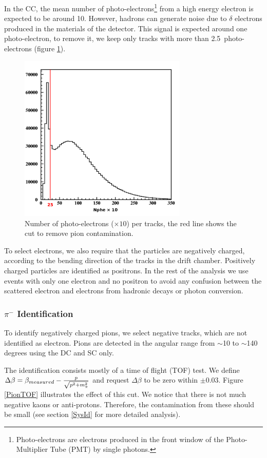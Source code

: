 In the CC, the mean number of photo-electrons\footnote{Photo-electrons are 
electrons produced in the front window of the Photo-Multiplier Tube (PMT) by 
single photons.} from a high energy electron is expected to be around 10.
However, hadrons can generate noise due to $\delta$ electrons produced in 
the materials of the detector. This signal is expected around 
one photo-electron, to remove it, we keep only tracks with more than 
2.5~photo-electrons (figure \ref{delta}). 

\begin{figure}[tbp]
\centering
\includegraphics[width=8cm] {chap5-fig/fig04.png} 
\caption {Number of photo-electrons ($\times 10$) per tracks, the red line 
shows the cut to remove pion contamination.}
\label{delta}
\end{figure}

To select electrons, we also require that the particles are negatively charged, 
according to the bending direction of the tracks in the drift chamber.
Positively charged particles are identified as positrons. In the rest of the 
analysis we use events with only one electron and no positron to avoid any 
confusion between the scattered electron and electrons from hadronic decays or 
photon conversion.

\subsubsection{$\pi^-$ Identification}
\label{PiId}

To identify negatively charged pions, we select negative tracks, which are not 
identified as electron. Pions are detected in the angular range from $\sim$10 to 
$\sim$140 degrees using the DC and SC only.

The identification consists mostly of a time of flight (TOF) test. We define 
$\Delta \beta = \beta_{measured} - {p \over \sqrt{p^2 + m_\pi^2}}$ and request 
$\Delta \beta$ to be zero within $\pm 0.03$. Figure \ref{PionTOF} illustrates 
the effect of this cut. We notice that there is not much negative kaons or 
anti-protons. Therefore, the contamination from these should be small (see 
section \ref{SysId} for more detailed analysis).

